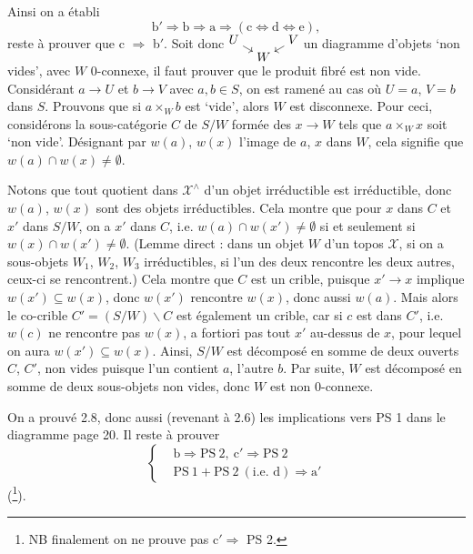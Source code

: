 \documentclass[11pt]{article}
\newcommand{\printedpage}[1]{\marginpar{\footnotesize p.~#1}}
\newcommand{\msp}[1]{\marginpar{\footnotesize [#1]}}
\newcommand{\X}{\mathcal{X}}
\begin{document}
Ainsi on a établi
\[
\mathrm{b}'\Longrightarrow\mathrm{b}\Longrightarrow\mathrm{a}\Longrightarrow(\mathrm{c}\Longleftrightarrow\mathrm{d}\Longleftrightarrow\mathrm{e}),
\]
reste à prouver que c $\Longrightarrow$ b$'$. Soit donc $\begin{tikzcd}[cramped, row sep=0.1em, column sep=0.8em, baseline=(current bounding box.center)] U \arrow[dr] & & V \arrow[dl] \\ & W & \end{tikzcd}$ un diagramme d'objets `non vides', avec $W$ 0-connexe, il faut prouver que le produit fibré est non vide. Considérant $a\longrightarrow U$ et $b\longrightarrow V$ avec $a,b\in S$, on est ramené au cas où $U=a$, $V=b$ dans $S$. Prouvons que si $a\times_W b$ est `vide', alors $W$ est disconnexe. Pour ceci, considérons la sous-catégorie $C$ de $S/W$ formée des $x\longrightarrow W$ tels que $a\times_W x$ soit `non vide'. Désignant par $w(a)$, $w(x)$ l'image de $a$, $x$ dans $W$, cela signifie que $w(a)\cap w(x)\neq\emptyset$.

\msp{page 23}Notons que tout quotient dans $\X^\wedge$ d'un objet irréductible est irréductible, donc $w(a)$, $w(x)$ sont des objets irréductibles. Cela montre que pour $x$ dans $C$ et $x'$ dans $S/W$, on a $x'$ dans $C$, i.e. $w(a)\cap w(x')\neq\emptyset$ si et seulement si $w(x)\cap w(x')\neq\emptyset$. (Lemme direct : dans un objet $W$ d'un topos $\X$, si on a sous-objets $W_1$, $W_2$, $W_3$ irréductibles, si l'un des deux rencontre les deux autres, ceux-ci se rencontrent.) Cela montre que $C$ est un crible, puisque $x'\longrightarrow x$ implique $w(x')\subseteq w(x)$, donc $w(x')$ rencontre $w(x)$, donc aussi $w(a)$. Mais alors le co-crible $C'=(S/W)\backslash C$ est également un crible, car si $c$
\printedpage{15}
est dans $C'$, i.e. $w(c)$ ne rencontre pas $w(x)$, a fortiori pas tout $x'$ au-dessus de $x$, pour lequel on aura $w(x')\subseteq w(x)$. Ainsi, $S/W$ est décomposé en somme de deux ouverts $C$, $C'$, non vides puisque l'un contient $a$, l'autre $b$. Par suite, $W$ est décomposé en somme de deux sous-objets non vides, donc $W$ est non 0-connexe.

On a prouvé 2.8, donc aussi (revenant à 2.6) les implications vers PS 1 dans le diagramme page 20. Il reste à prouver
\[
\left\{
\begin{aligned}
&\mathrm{b}\Longrightarrow\mathrm{PS}\ 2,\ \mathrm{c}'\Longrightarrow\mathrm{PS}\ 2\\
&\mathrm{PS}\ 1+\mathrm{PS}\ 2\ (\text{i.e. d})\Longrightarrow\mathrm{a}'
\end{aligned}
\right.
\]
(\footnote[32]{NB finalement on ne prouve pas c$'\Longrightarrow$ PS 2.}).
\end{document}
